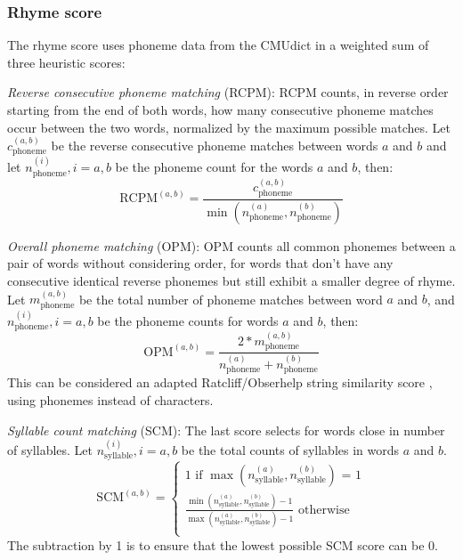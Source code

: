 \documentclass[11pt,a4paper]{article}
\newenvironment{tight_itemize}{
\begin{itemize}
\setlength{\itemsep}{0pt}
\setlength{\parskip}{0pt}
}{\end{itemize}}
\begin{document}
\subsubsection{Rhyme score}
\label{sec:rhymescore}
The rhyme score uses phoneme data from the CMUdict in a weighted sum of three heuristic scores:
\begin{tight_itemize}
	\vspace{-0.5em}
	\item \textit{Reverse consecutive phoneme matching} (RCPM):
	RCPM counts, in reverse order starting from the end of both words, how many consecutive phoneme matches occur between the two words, normalized by the maximum possible matches. Let $c^{(a,b)}_{\text{phoneme}}$ be the reverse consecutive phoneme matches between words $a$ and $b$ and let $n^{(i)}_{\text{phoneme}}, i = {a, b}$ be the phoneme count for the words $a$ and $b$, then:
	$$\textrm{RCPM}^{(a,b)} = \frac{c^{(a,b)}_{\text{phoneme}}}{\min(n^{(a)}_{\text{phoneme}}, n^{(b)}_{\text{phoneme}})}$$
	\item \textit{Overall phoneme matching} (OPM):
		OPM counts all common phonemes between a pair of words without considering order, for words that don't have any consecutive identical reverse phonemes but still exhibit a smaller degree of rhyme. Let $m^{(a,b)}_{\text{phoneme}}$ be the total number of phoneme matches between word $a$ and $b$, and $n^{(i)}_{\text{phoneme}}, i = {a, b}$ be the phoneme counts for words $a$ and $b$, then:
		$$\textrm{OPM}^{(a,b)} = \frac{2 * m^{(a,b)}_{\text{phoneme}}}{n^{(a)}_{\text{phoneme}} + n^{(b)}_{\text{phoneme}}}$$
		This can be considered an adapted Ratcliff/Obserhelp string similarity score \cite{ratcliff}, using phonemes instead of characters.
	\item \textit{Syllable count matching} (SCM):
	The last score selects for words close in number of syllables. Let $n^{(i)}_{\text{syllable}}, i = {a, b}$ be the total counts of syllables in words $a$ and $b$.
	\begin{equation}
	\textrm{SCM}^{(a,b)} = 
	\begin{cases}
	\nonumber 1 \text{ if $\max(n^{(a)}_{\text{syllable}}, n^{(b)}_{\text{syllable}})$ = 1}\\
	\nonumber \frac{\min(n^{(a)}_{\text{syllable}}, n^{(b)}_{\text{syllable}}) - 1}{\max(n^{(a)}_{\text{syllable}}, n^{(b)}_{\text{syllable}}) - 1} \text{ otherwise}\\
        \end{cases}
	\end{equation}
	The subtraction by 1 is to ensure that the lowest possible SCM score can be 0.
\end{tight_itemize}
\end{document}

